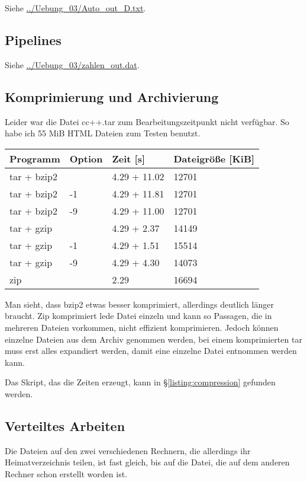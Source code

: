 \documentclass[10pt]{article}
\begin{document}
Siehe \url{../Uebung_03/Auto_out_D.txt}.

\subsection{Pipelines}

Siehe \url{../Uebung_03/zahlen_out.dat}.

\subsection{Komprimierung und Archivierung}

Leider war die Datei cc++.tar zum Bearbeitungszeitpunkt nicht verfügbar. So habe ich 55 MiB HTML Dateien zum Testen benutzt.

\begin{tabular}{llll}
Programm & Option & Zeit [s] & Dateigröße [KiB] \\
\hline
tar + bzip2 &  & 4.29 + 11.02 & 12701 \\
tar + bzip2 & -1 & 4.29 + 11.81 & 12701 \\
tar + bzip2 & -9 & 4.29 + 11.00 & 12701 \\
tar + gzip &  & 4.29 + 2.37 & 14149 \\
tar + gzip & -1 & 4.29 + 1.51 & 15514 \\
tar + gzip & -9 & 4.29 + 4.30 & 14073 \\
zip &  & 2.29 & 16694\\
\end{tabular}

Man sieht, dass bzip2 etwas besser komprimiert, allerdings deutlich länger braucht. Zip komprimiert lede Datei einzeln und kann so Passagen, die in mehreren Dateien vorkommen, nicht effizient komprimieren. Jedoch können einzelne Dateien aus dem Archiv genommen werden, bei einem komprimierten tar muss erst alles expandiert werden, damit eine einzelne Datei entnommen werden kann.

Das Skript, das die Zeiten erzeugt, kann in §\ref{listing:compression} gefunden werden.


\subsection{Verteiltes Arbeiten}

Die Dateien auf den zwei verschiedenen Rechnern, die allerdings ihr Heimatverzeichnis teilen, ist fast gleich, bis auf die Datei, die auf dem anderen Rechner schon erstellt worden ist.
\end{document}
